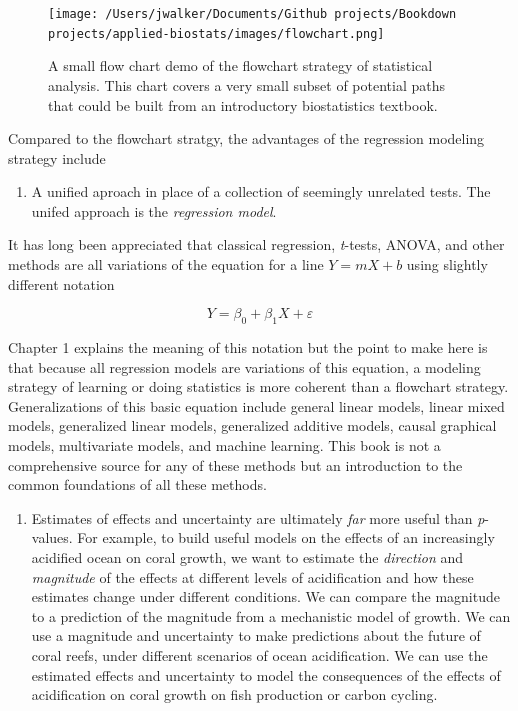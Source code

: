 \documentclass[]{book}
\providecommand{\tightlist}{%
  \setlength{\itemsep}{0pt}\setlength{\parskip}{0pt}}
\begin{document}
\begin{figure}
\centering
\texttt{[image: /Users/jwalker/Documents/Github projects/Bookdown projects/applied-biostats/images/flowchart.png]}
\caption{\label{fig:flowchart}A small flow chart demo of the flowchart strategy of statistical analysis. This chart covers a very small subset of potential paths that could be built from an introductory biostatistics textbook.}
\end{figure}

Compared to the flowchart stratgy, the advantages of the regression modeling strategy include

\begin{enumerate}
\def\labelenumi{\arabic{enumi}.}
\tightlist
\item
  A unified aproach in place of a collection of seemingly unrelated tests. The unifed approach is the \emph{regression model}.
\end{enumerate}

It has long been appreciated that classical regression, \emph{t}-tests, ANOVA, and other methods are all variations of the equation for a line \(Y = mX + b\) using slightly different notation

\begin{equation}
Y = \beta_0 + \beta_1 X + \varepsilon
\end{equation}

Chapter 1 explains the meaning of this notation but the point to make here is that because all regression models are variations of this equation, a modeling strategy of learning or doing statistics is more coherent than a flowchart strategy. Generalizations of this basic equation include general linear models, linear mixed models, generalized linear models, generalized additive models, causal graphical models, multivariate models, and machine learning. This book is not a comprehensive source for any of these methods but an introduction to the common foundations of all these methods.

\begin{enumerate}
\def\labelenumi{\arabic{enumi}.}
\setcounter{enumi}{1}
\tightlist
\item
  Estimates of effects and uncertainty are ultimately \emph{far} more useful than \emph{p}-values. For example, to build useful models on the effects of an increasingly acidified ocean on coral growth, we want to estimate the \emph{direction} and \emph{magnitude} of the effects at different levels of acidification and how these estimates change under different conditions. We can compare the magnitude to a prediction of the magnitude from a mechanistic model of growth. We can use a magnitude and uncertainty to make predictions about the future of coral reefs, under different scenarios of ocean acidification. We can use the estimated effects and uncertainty to model the consequences of the effects of acidification on coral growth on fish production or carbon cycling.
\end{enumerate}
\end{document}
